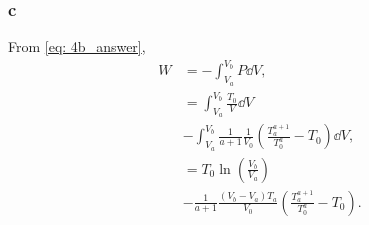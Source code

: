 \documentclass[a4paper,12pt,twoside]{article}
\begin{document}
\begin{multicols*}{2}
\subsubsection*{c}
From \ref{eq: 4b_answer},
\begin{align}
	W &= -\int_{V_a}^{V_b} P \dd{V},\\
	&= \int_{V_a}^{V_b} \frac{T_0}{V}\dd{V} \nonumber\\
	&- \int_{V_a}^{V_b}\frac{1}{a+1} \frac{1}{V_0}\left( \frac{T_a^{a+1}}{T_0^{a}} - T_0 \right) \dd{V},\\
	&= T_0\ln(\frac{V_b}{V_a}) \nonumber \\
	&- \frac{1}{a+1}\frac{(V_b-V_a)T_a}{V_0}\left( \frac{T_a^{a+1}}{T_0^{a}} - T_0 \right).
\end{align}

\nocite{*}
\printbibliography[title={References},heading=bibnumbered]


\end{multicols*}
\end{document}
